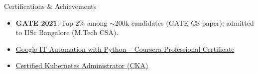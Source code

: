 \documentclass{resume} %
\begin{document}





\begin{rSection}{Certifications \& Achievements} 
\begin{itemize}
    \item \textbf{GATE 2021}: Top 2\% among $\sim$200k candidates (GATE CS paper); admitted to IISc Bangalore (M.Tech CSA).
    \item \href{https://www.credly.com/badges/75d9811c-198b-4dc5-a41d-dd3a6e6d9ee3/public_url}{Google IT Automation with Python – Coursera Professional Certificate}
    \item \href{https://www.credly.com/badges/5e298069-3cc7-4a4b-b30c-79a8ae8f624f/public_url}{Certified Kubernetes Administrator (CKA)}
\end{itemize}

\end{rSection}
\end{document}
